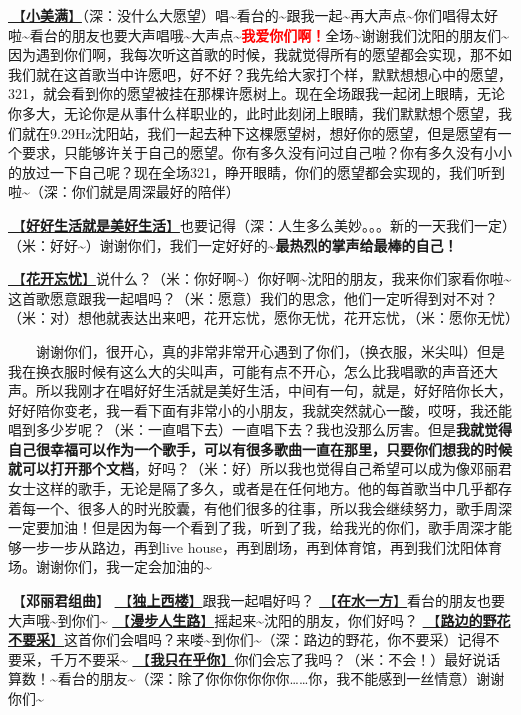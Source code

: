 \documentclass[]{ctexbook}
\begin{document}
\hyperref[happy-ending]{🎵【\textbf{小美满}】}（深：没什么大愿望）唱\textasciitilde 看台的\textasciitilde 跟我一起\textasciitilde 再大声点\textasciitilde 你们唱得太好啦\textasciitilde 看台的朋友也要大声唱哦\textasciitilde 大声点\textasciitilde{}\textbf{\textcolor{red}{我爱你们啊！}}全场\textasciitilde 谢谢我们沈阳的朋友们\textasciitilde 因为遇到你们啊，我每次听这首歌的时候，我就觉得所有的愿望都会实现，那不如我们就在这首歌当中许愿吧，好不好？我先给大家打个样，默默想想心中的愿望，321，就会看到你的愿望被挂在那棵许愿树上。现在全场跟我一起闭上眼睛，无论你多大，无论你是从事什么样职业的，此时此刻闭上眼睛，我们默默想个愿望，我们就在9.29Hz沈阳站，我们一起去种下这棵愿望树，想好你的愿望，但是愿望有一个要求，只能够许关于自己的愿望。你有多久没有问过自己啦？你有多久没有小小的放过一下自己呢？现在全场321，睁开眼睛，你们的愿望都会实现的，我们听到啦\textasciitilde（深：你们就是周深最好的陪伴）

\hyperref[live-happy-life-happy]{🎵【\textbf{好好生活就是美好生活}】}也要记得（深：人生多么美妙。。。新的一天我们一定）（米：好好\textasciitilde）谢谢你们，我们一定好好的\textasciitilde{}\textbf{最热烈的掌声给最棒的自己！}

\hyperref[no-worries]{🎵【\textbf{花开忘忧}】}说什么？（米：你好啊\textasciitilde）你好啊\textasciitilde 沈阳的朋友，我来你们家看你啦\textasciitilde 这首歌愿意跟我一起唱吗？（米：愿意）我们的思念，他们一定听得到对不对？（米：对）想他就表达出来吧，花开忘忧，愿你无忧，花开忘忧，（米：愿你无忧）

  谢谢你们，很开心，真的非常非常开心遇到了你们，（换衣服，米尖叫）但是我在换衣服时候有这么大的尖叫声，可能有点不开心，怎么比我唱歌的声音还大声。所以我刚才在唱好好生活就是美好生活，中间有一句，就是，好好陪你长大，好好陪你变老，我一看下面有非常小的小朋友，我就突然就心一酸，哎呀，我还能唱到多少岁呢？（米：一直唱下去）一直唱下去？我也没那么厉害。但是\textbf{我就觉得自己很幸福可以作为一个歌手，可以有很多歌曲一直在那里，只要你们想我的时候就可以打开那个文档}，好吗？（米：好）所以我也觉得自己希望可以成为像邓丽君女士这样的歌手，无论是隔了多久，或者是在任何地方。他的每首歌当中几乎都存着每一个、很多人的时光胶囊，有他们很多的往事，所以我会继续努力，歌手周深一定要加油！但是因为每一个看到了我，听到了我，给我光的你们，歌手周深才能够一步一步从路边，再到live house，再到剧场，再到体育馆，再到我们沈阳体育场。谢谢你们，我一定会加油的\textasciitilde{}

🎵【\textbf{邓丽君组曲}】
\hyperref[one-in-the-building]{🎵【\textbf{独上西楼}】}跟我一起唱好吗？
\hyperref[on-the-water-side]{🎵【\textbf{在水一方}】}看台的朋友也要大声哦\textasciitilde 到你们\textasciitilde{}
\hyperref[walk-the-road-of-life]{🎵【\textbf{漫步人生路}】}摇起来\textasciitilde 沈阳的朋友，你们好吗？
\hyperref[only-with-me]{🎵【\textbf{路边的野花不要采}】}这首你们会唱吗？来喽\textasciitilde 到你们\textasciitilde（深：路边的野花，你不要采）记得不要采，千万不要采\textasciitilde{}
\hyperref[only-you]{🎵【\textbf{我只在乎你}】}你们会忘了我吗？（米：不会！）最好说话算数！\textasciitilde 看台的朋友\textasciitilde（深：除了你你你你你你\ldots\ldots 你，我不能感到一丝情意）谢谢你们\textasciitilde{}
\end{document}
